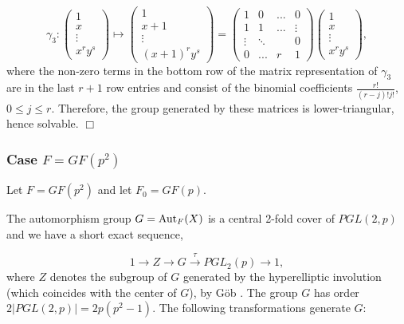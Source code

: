\documentclass[12pt]{article}
\numberwithin{equation}{section}
\def\Aut{{\rm{Aut}}}
\def\qed{$\Box$}
\begin{document}
\[
\gamma_3:
\left(
\begin{array}{c}
1\\
x\\
\vdots \\
x^ry^s
\end{array}
\right)
\longmapsto 
\left(
\begin{array}{c}
1\\
x+1\\
\vdots \\
(x+1)^ry^s
\end{array}
\right)
=
\left(
\begin{array}{cccc}
1 & 0 & ...& 0\\
1 & 1 & ...& \vdots\\
\vdots &\ddots  & &0 \\
0 & ... & r & 1
\end{array}
\right)
\left(
\begin{array}{c}
1\\
x\\
\vdots \\
x^ry^s
\end{array}
\right),
\]
where the non-zero terms in the
bottom row of the matrix representation of
$\gamma_3$ are in the last $r+1$ row entries and
consist of the binomial coefficients $\frac{r!}{(r-j)!j!}$,
$0\leq j\leq r$.
Therefore, the group generated by these matrices is 
lower-triangular, hence solvable. \qed

\subsubsection{Case $F=GF(p^2)$}
\label{sec:gfp2}

Let $F=GF(p^2)$ and let $F_0=GF(p)$.

The automorphism group $G=\Aut_F(X)$ is
a central 2-fold cover of $PGL(2,p)$ and
we have a short exact sequence,

\begin{equation}
\label{eqn:**}
1\rightarrow Z \rightarrow G
\stackrel{\tau}{\rightarrow} PGL_2(p)\rightarrow 1,
\end{equation}
where $Z$ denotes the subgroup of $G$ generated by 
the hyperelliptic
involution (which coincides with the center of $G$), 
by G\"ob \cite{G}.
The group $G$ has order $2|PGL(2,p)|=2p(p^2-1)$.
The following transformations generate $G$:
\end{document}

